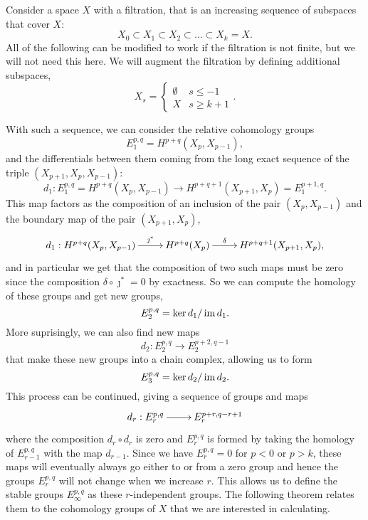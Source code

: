 Consider a space $X$ with a filtration, that is an increasing sequence
of subspaces that cover $X$:
\[ X_0 \subset X_1 \subset X_2 \subset
\dots \subset X_k  = X. \]
All of the following can be modified to work if the filtration is not
finite, but we will not need this here. We will augment the filtration
by defining additional subspaces,
\[ X_s =
\begin{cases}
  \emptyset & s \leq -1 \\
  X & s \geq k+1
\end{cases}. \]

With such a sequence, we can
consider the relative cohomology groups
\[ E_1^{p,q} = H^{p+q}(X_p,X_{p-1}), \]
and the differentials between them coming from the long exact sequence
of the triple $(X_{p+1},X_p,X_{p-1})$:
\[ d_1 : E_1^{p,q} = H^{p+q}(X_p,X_{p-1}) \to H^{p+q+1}(X_{p+1},X_p) =
E_1^{p+1,q}. \]
This map factors as the composition of an
inclusion of the pair $(X_p,X_{p-1})$ and the boundary map of the pair
$(X_{p+1},X_p)$,
\[ \xymatrix{ d_1 : H^{p+q}(X_p,X_{p-1}) \ar[r]^<<<<<{\jmath^*} &
  H^{p+q}(X_p) \ar[r]^<<<<<{\delta} & H^{p+q+1}(X_{p+1},X_p),
} \]
and in particular we get that the composition of two such maps must be
zero since the composition $\delta \circ \jmath^* = 0$ by
exactness. So we can compute the homology of these groups and get new
groups,
\[ E_2^{p,q} = \ker d_1 / \operatorname{im} d_1. \]
More suprisingly, we can also find new maps
\[ d_2 : E_2^{p,q} \to E_2^{p+2,q-1} \]
that make these new groups into a chain complex, allowing us to form
\[ E_3^{p,q} = \ker d_2 / \operatorname{im} d_2. \]
This process can be continued, giving a sequence of groups and maps
\[ \xymatrix{d_r : E_r^{p,q} \ar[r] & E_r^{p+r,q-r+1} } \]
where the composition $d_r \circ d_r$ is zero and
$E_r^{p,q}$ is formed by taking the homology of $E_{r-1}^{p,q}$ with
the map $d_{r-1}$. Since we have $E_r^{p,q} = 0$ for $p < 0$ or $p >
k$, these maps will eventually always go either to or from a zero
group and hence the groups $E_r^{p,q}$ will not change when we
increase $r$. This allows us to
define the stable groups $E_\infty^{p,q}$ as these $r$-independent
groups. The following theorem relates them to the cohomology groups of
$X$ that we are interested in calculating.

